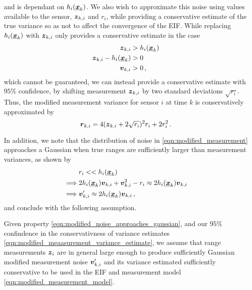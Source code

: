 \documentclass[twocolumn]{autart}
\begin{document}
and is dependant on $h_i({\boldsymbol{\underline{x}}}_k)$. We also wish to approximate this noise using values available to the sensor, ${\boldsymbol{z}}_{k,i}$ and $r_i$, while providing a conservative estimate of the true variance so as not to affect the convergence of the EIF. While replacing $h_i({\boldsymbol{\underline{x}}}_k)$ with ${\boldsymbol{z}}_{k,i}$ only provides a conservative estimate in the case
\begin{equation}
    \begin{split}
        {\boldsymbol{z}}_{k,i} &> h_i({\boldsymbol{\underline{x}}}_k) \\
        {\boldsymbol{z}}_{k,i} - h_i({\boldsymbol{\underline{x}}}_k) &> 0 \\
        {\boldsymbol{v}}_{k,i} &> 0\,,
    \end{split}
\end{equation}
which cannot be guaranteed, we can instead provide a conservative estimate with $95\%$ confidence, by shifting measurement ${\boldsymbol{z}}_{k,i}$ by two standard deviations $\sqrt{r_i}$. Thus, the modified measurement variance for sensor $i$ at time $k$ is conservatively approximated by
\begin{equation}
    {\boldsymbol{r}}_{k, i} = 4({\boldsymbol{z}}_{k,i} + 2\sqrt{r_i})^2r_i + 2r_i^2\,. \label{eqn:modified_meaasurement_variance_estimate}
\end{equation}

In addition, we note that the distribution of noise in \eqref{eqn:modified_measurement} approaches a Gaussian when true ranges are sufficiently larger than measurement variances, as shown by
\begin{equation}
    \begin{split}
        &r_i << h_i({\boldsymbol{\underline{x}}}_k) \\
        \implies &2h_i({\boldsymbol{\underline{x}}}_k){\boldsymbol{v}}_{k,i} + {\boldsymbol{v}}_{k,i}^2 - r_i \approx 2h_i({\boldsymbol{\underline{x}}}_k){\boldsymbol{v}}_{k,i} \\
        \implies &{\boldsymbol{v}}'_{k,i} \approx 2h_i({\boldsymbol{\underline{x}}}_k){\boldsymbol{v}}_{k,i}\,,
    \end{split} \label{eqn:modified_noise_approaches_gaussian}
\end{equation}
and conclude with the following assumption.
\begin{assum}
    Given property \eqref{eqn:modified_noise_approaches_gaussian}, and our $95\%$ confindence in the conservativness of variance estimates \eqref{eqn:modified_meaasurement_variance_estimate}, we assume that range measurements ${\boldsymbol{z}}_i$ are in general large enough to produce sufficiently Gaussian modified measurement noise ${\boldsymbol{v}}'_{k,i}$ and its variance estimated sufficiently conservative to be used in the EIF and measurement model \eqref{eqn:modified_measurement_model}.
\end{assum}
\end{document}

